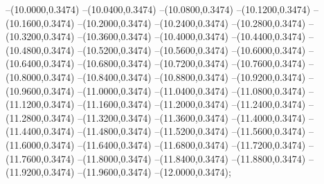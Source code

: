 {	--(10.0000,0.3474)
	--(10.0400,0.3474)
	--(10.0800,0.3474)
	--(10.1200,0.3474)
	--(10.1600,0.3474)
	--(10.2000,0.3474)
	--(10.2400,0.3474)
	--(10.2800,0.3474)
	--(10.3200,0.3474)
	--(10.3600,0.3474)
	--(10.4000,0.3474)
	--(10.4400,0.3474)
	--(10.4800,0.3474)
	--(10.5200,0.3474)
	--(10.5600,0.3474)
	--(10.6000,0.3474)
	--(10.6400,0.3474)
	--(10.6800,0.3474)
	--(10.7200,0.3474)
	--(10.7600,0.3474)
	--(10.8000,0.3474)
	--(10.8400,0.3474)
	--(10.8800,0.3474)
	--(10.9200,0.3474)
	--(10.9600,0.3474)
	--(11.0000,0.3474)
	--(11.0400,0.3474)
	--(11.0800,0.3474)
	--(11.1200,0.3474)
	--(11.1600,0.3474)
	--(11.2000,0.3474)
	--(11.2400,0.3474)
	--(11.2800,0.3474)
	--(11.3200,0.3474)
	--(11.3600,0.3474)
	--(11.4000,0.3474)
	--(11.4400,0.3474)
	--(11.4800,0.3474)
	--(11.5200,0.3474)
	--(11.5600,0.3474)
	--(11.6000,0.3474)
	--(11.6400,0.3474)
	--(11.6800,0.3474)
	--(11.7200,0.3474)
	--(11.7600,0.3474)
	--(11.8000,0.3474)
	--(11.8400,0.3474)
	--(11.8800,0.3474)
	--(11.9200,0.3474)
	--(11.9600,0.3474)
	--(12.0000,0.3474);
}
